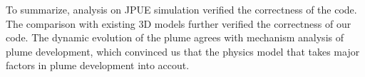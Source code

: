 \documentclass[10pt,a4paper]{article}
\begin{document}
To summarize, analysis on JPUE simulation verified the correctness of the code. The comparison with existing 3D models further verified the correctness of our code. The dynamic evolution of the plume agrees with mechanism analysis of plume development, which convinced us that the physics model that takes major factors in plume development into accout.
\end{document}
